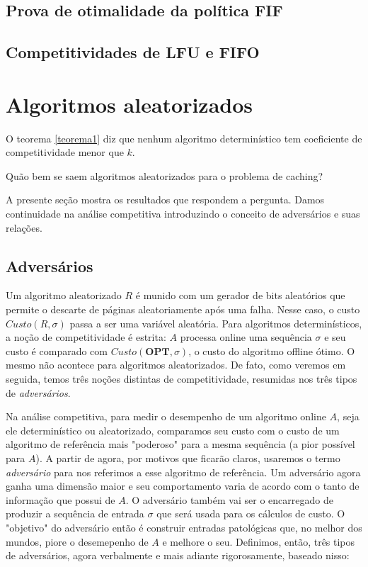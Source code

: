 \subsection{Prova de otimalidade da política \textbf{FIF}}

\subsection{Competitividades de \textbf{LFU} e \textbf{FIFO}}

\section{Algoritmos aleatorizados}

O teorema \ref{teorema1} diz que nenhum algoritmo determinístico tem coeficiente de competitividade menor que \(k\). 

Quão bem se saem algoritmos aleatorizados para o problema de caching?

A presente seção mostra os resultados que respondem a pergunta. Damos continuidade na análise competitiva introduzindo o conceito de adversários e suas relações.

\subsection{Adversários}

Um algoritmo aleatorizado \(R\) é munido com um gerador de bits aleatórios que permite o descarte de páginas aleatoriamente após uma falha. Nesse caso, o custo \(Custo(R,\sigma)\) passa a ser uma variável aleatória. Para algoritmos determinísticos, a noção de competitividade é estrita: \(A\) processa online uma sequência \(\sigma\) e seu custo é comparado com \(Custo(\textbf{OPT}, \sigma)\), o custo do algoritmo offline ótimo. O mesmo não acontece para algoritmos aleatorizados. De fato, como veremos em seguida, temos três noções distintas de competitividade, resumidas nos três tipos de \textit{adversários}. 

Na análise competitiva, para medir o desempenho de um algoritmo online \(A\), seja ele determinístico ou aleatorizado, comparamos seu custo com o custo de um algoritmo de referência mais "poderoso" para a mesma sequência (a pior possível para \(A\)). 
A partir de agora, por motivos que ficarão claros, usaremos o termo \textit{adversário} para nos referimos a esse algoritmo de referência. Um adversário agora ganha uma dimensão maior e seu comportamento varia de acordo com o tanto de informação que possui de \(A\). O adversário também vai ser o encarregado de produzir a sequência de entrada \(\sigma\) que será usada para os cálculos de custo. O "objetivo" do adversário então é construir entradas patológicas que, no melhor dos mundos, piore o desemepenho de \(A\) e melhore o seu. Definimos, então, três tipos de adversários, agora verbalmente e mais adiante rigorosamente, baseado nisso:

